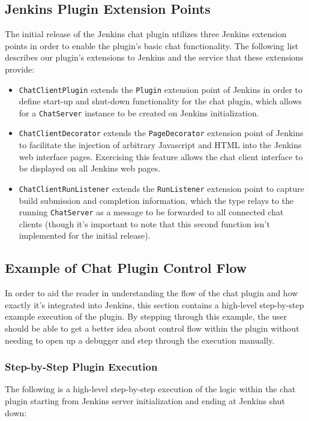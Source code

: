 \documentclass{article}
\newcommand{\classname}[1] {\texttt{#1}}
\begin{document}
		\subsection[Jenkins Extensions]{Jenkins Plugin Extension Points}
		The initial release of the Jenkins chat plugin utilizes three Jenkins
		extension points in order to enable the plugin's basic chat functionality.
		The following list describes our plugin's extensions to Jenkins and the
		service that these extensions provide:

		\begin{itemize}
			\item \classname{ChatClientPlugin} extends the \classname{Plugin} extension
			point of Jenkins in order to define start-up and shut-down functionality
			for the chat plugin, which allows for a \classname{ChatServer} instance
			to be created on Jenkins initialization.
			\item \classname{ChatClientDecorator} extends the \classname{PageDecorator} 
			extension point of Jenkins to facilitate the injection of arbitrary
			Javascript and HTML into the Jenkins web interface pages.  Exercising this 
			feature allows the chat client interface to be displayed on all Jenkins 
			web pages.
			\item \classname{ChatClientRunListener} extends the \classname{RunListener}
			extension point to capture build submission and completion information,
			which the type relays to the running \classname{ChatServer} as a message
			to be forwarded to all connected chat clients (though it's important to
			note that this second function isn't implemented for the initial release).
		\end{itemize}

		\subsection[Control Flow]{Example of Chat Plugin Control Flow}
		In order to aid the reader in understanding the flow of the chat plugin
		and how exactly it's integrated into Jenkins, this section contains a
		high-level step-by-step example execution of the plugin.  By stepping
		through this example, the user should be able to get a better idea
		about control flow within the plugin without needing to open up a debugger
		and step through the execution manually.

			\subsubsection[Step-by-Step Execution]{Step-by-Step Plugin Execution}
			The following is a high-level step-by-step execution of the logic
			within the chat plugin starting from Jenkins server initialization
			and ending at Jenkins shut down:
\end{document}
